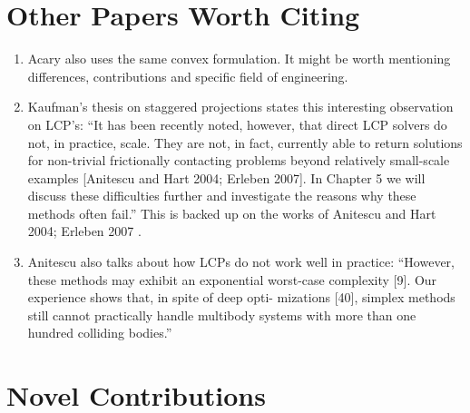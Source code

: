 \section{Other Papers Worth Citing}

\begin{enumerate}
	\item Acary \cite{bib:acary2011formulation} also uses the same convex
	formulation. It might be worth mentioning differences, contributions and
	specific field of engineering.
	\item Kaufman's thesis on staggered projections
	\cite{bib:kaufman2009coupled} states this interesting observation on LCP's:
	``It has been recently noted, however, that direct LCP solvers do not, in
	practice, scale. They are not, in fact, currently able to return solutions
	for non-trivial frictionally contacting problems beyond relatively
	small-scale examples [Anitescu and Hart 2004; Erleben 2007]. In Chapter 5 we
	will discuss these difficulties further and investigate the reasons why
	these methods often fail.'' This is backed up on the works of Anitescu and
	Hart 2004; Erleben 2007
	\cite{bib:anitescu2004fixed,bib:erleben2007velocity}.
	\item Anitescu \cite{bib:anitescu2010} also talks about how LCPs do not work
	well in practice: ``However, these methods may exhibit an exponential
	worst-case complexity [9]. Our experience shows that, in spite of deep opti-
	mizations [40], simplex methods still cannot practically handle multibody
	systems with more than one hundred colliding bodies.''
\end{enumerate}

\section{Novel Contributions}

